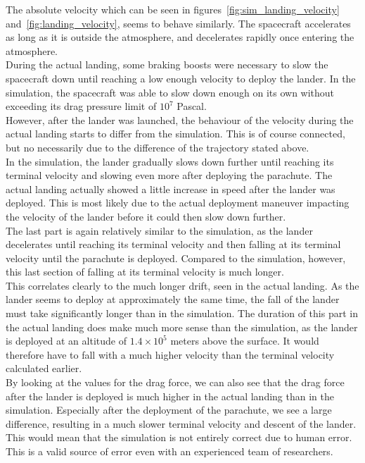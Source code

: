 \documentclass[reprint,english,notitlepage]{revtex4-2}
\begin{document}
The absolute velocity which can be seen in figures~\ref{fig:sim_landing_velocity} and~\ref{fig:landing_velocity}, seems to behave similarly.
The spacecraft accelerates as long as it is outside the atmosphere, and decelerates rapidly once entering the atmosphere.\\
During the actual landing, some braking boosts were necessary to slow the spacecraft down until reaching a low enough velocity to deploy the lander.
In the simulation, the spacecraft was able to slow down enough on its own without exceeding its drag pressure limit of $10^7$ Pascal.\\
However, after the lander was launched, the behaviour of the velocity during the actual landing starts to differ from the simulation.
This is of course connected, but no necessarily due to the difference of the trajectory stated above.\\
In the simulation, the lander gradually slows down further until reaching its terminal velocity and slowing even more after deploying the parachute.
The actual landing actually showed a little increase in speed after the lander was deployed.
This is most likely due to the actual deployment maneuver impacting the velocity of the lander before it could then slow down further.\\
The last part is again relatively similar to the simulation, as the lander decelerates until reaching its terminal velocity and then falling at its terminal velocity until the parachute is deployed.
Compared to the simulation, however, this last section of falling at its terminal velocity is much longer.\\

This correlates clearly to the much longer drift, seen in the actual landing.
As the lander seems to deploy at approximately the same time, the fall of the lander must take significantly longer than in the simulation.
The duration of this part in the actual landing does make much more sense than the simulation, as the lander is deployed at an altitude of $1.4 \times 10^5$ meters above the surface.
It would therefore have to fall with a much higher velocity than the terminal velocity calculated earlier.\\
By looking at the values for the drag force, we can also see that the drag force after the lander is deployed is much higher in the actual landing than in the simulation.
Especially after the deployment of the parachute, we see a large difference, resulting in a much slower terminal velocity and descent of the lander.
This would mean that the simulation is not entirely correct due to human error.
This is a valid source of error even with an experienced team of researchers.\\
\end{document}
